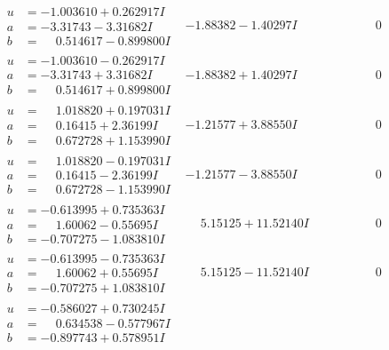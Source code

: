 \documentclass[1p]{elsarticle_modified}
\theoremstyle{definition}
\begin{document}
$$\begin{array}{c|c|c}
\begin{aligned}
u &= -1.003610 + 0.262917 I \\
a &= -3.31743 - 3.31682 I \\
b &= \phantom{-}0.514617 - 0.899800 I\end{aligned}
 & -1.88382 - 1.40297 I & \phantom{-0.000000 } 0 \\ \hline\begin{aligned}
u &= -1.003610 - 0.262917 I \\
a &= -3.31743 + 3.31682 I \\
b &= \phantom{-}0.514617 + 0.899800 I\end{aligned}
 & -1.88382 + 1.40297 I & \phantom{-0.000000 } 0 \\ \hline\begin{aligned}
u &= \phantom{-}1.018820 + 0.197031 I \\
a &= \phantom{-}0.16415 + 2.36199 I \\
b &= \phantom{-}0.672728 + 1.153990 I\end{aligned}
 & -1.21577 + 3.88550 I & \phantom{-0.000000 } 0 \\ \hline\begin{aligned}
u &= \phantom{-}1.018820 - 0.197031 I \\
a &= \phantom{-}0.16415 - 2.36199 I \\
b &= \phantom{-}0.672728 - 1.153990 I\end{aligned}
 & -1.21577 - 3.88550 I & \phantom{-0.000000 } 0 \\ \hline\begin{aligned}
u &= -0.613995 + 0.735363 I \\
a &= \phantom{-}1.60062 - 0.55695 I \\
b &= -0.707275 - 1.083810 I\end{aligned}
 & \phantom{-}5.15125 + 11.52140 I & \phantom{-0.000000 } 0 \\ \hline\begin{aligned}
u &= -0.613995 - 0.735363 I \\
a &= \phantom{-}1.60062 + 0.55695 I \\
b &= -0.707275 + 1.083810 I\end{aligned}
 & \phantom{-}5.15125 - 11.52140 I & \phantom{-0.000000 } 0 \\ \hline\begin{aligned}
u &= -0.586027 + 0.730245 I \\
a &= \phantom{-}0.634538 - 0.577967 I \\
b &= -0.897743 + 0.578951 I\end{aligned}

\end{array}$$
\end{document}
